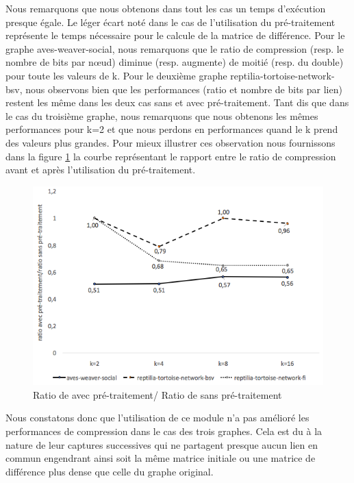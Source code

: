 Nous remarquons que nous obtenons dans tout les cas un temps d'exécution presque égale. Le léger écart noté dans le cas de l'utilisation du pré-traitement représente le temps nécessaire pour le calcule de la matrice de différence. 
Pour le graphe aves-weaver-social, nous remarquons que le ratio de compression (resp. le nombre de bits par nœud) diminue (resp. augmente) de moitié (resp. du double) pour toute les valeurs de k. Pour le deuxième graphe reptilia-tortoise-network-bsv, nous observons bien que les performances (ratio et nombre de bits par lien) restent les même dans les deux cas sans et avec pré-traitement. Tant dis que dans le cas du troisième graphe, nous remarquons que nous obtenons les mêmes performances pour k=2 et que nous perdons en performances quand le k prend des valeurs plus grandes. Pour mieux illustrer ces observation nous fournissons dans la figure \ref{perte } la courbe représentant le rapport entre le ratio de compression avant et après l'utilisation du pré-traitement. 


\begin{figure}[H]
	\centering
	\includegraphics[scale=0.5]{ressources/image/perteIk2.png}
	
	\caption{Ratio de avec pré-traitement/ Ratio de sans pré-traitement}
	\label{perte }
\end{figure}

Nous constatons donc que l'utilisation de ce module n'a pas amélioré les performances de compression dans le cas des trois graphes. Cela est du à la nature de leur captures successives qui ne partagent presque aucun lien en commun engendrant ainsi soit la même matrice initiale ou une matrice de différence plus dense que celle du graphe original.



